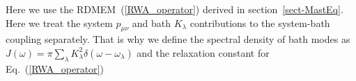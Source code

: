 \documentclass[12pt,twoside,a4paper]{report}
\begin{document}
Here we use the RDMEM~(\ref{RWA_operator})
derived in section~\ref{sect-MastEq}.
Here we treat the system $p_{\mu \nu}$
and bath $K_\lambda$
contributions to the system-bath coupling separately.
That is why we define 
the spectral density of bath modes as
$J
 (\omega)
          =
              \pi
              \sum_\lambda 
                  K_\lambda^2 
                  \delta
                 (\omega-\omega_\lambda)$
and the relaxation constant for Eq.~(\ref{RWA_operator}) 
%
%
\end{document}
